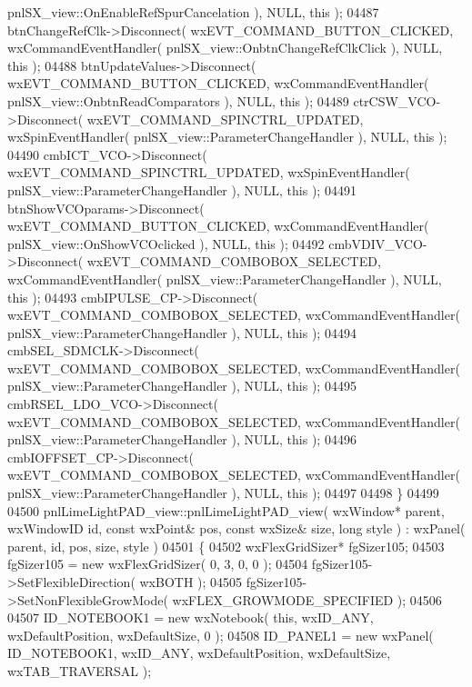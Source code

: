 \begin{DoxyCode}
      pnlSX_view::OnEnableRefSpurCancelation ), NULL, \textcolor{keyword}{this} );
04487     btnChangeRefClk->Disconnect( wxEVT\_COMMAND\_BUTTON\_CLICKED, wxCommandEventHandler( 
      pnlSX_view::OnbtnChangeRefClkClick ), NULL, \textcolor{keyword}{this} );
04488     btnUpdateValues->Disconnect( wxEVT\_COMMAND\_BUTTON\_CLICKED, wxCommandEventHandler( 
      pnlSX_view::OnbtnReadComparators ), NULL, \textcolor{keyword}{this} );
04489     ctrCSW_VCO->Disconnect( wxEVT\_COMMAND\_SPINCTRL\_UPDATED, wxSpinEventHandler( 
      pnlSX_view::ParameterChangeHandler ), NULL, \textcolor{keyword}{this} );
04490     cmbICT_VCO->Disconnect( wxEVT\_COMMAND\_SPINCTRL\_UPDATED, wxSpinEventHandler( 
      pnlSX_view::ParameterChangeHandler ), NULL, \textcolor{keyword}{this} );
04491     btnShowVCOparams->Disconnect( wxEVT\_COMMAND\_BUTTON\_CLICKED, wxCommandEventHandler( 
      pnlSX_view::OnShowVCOclicked ), NULL, \textcolor{keyword}{this} );
04492     cmbVDIV_VCO->Disconnect( wxEVT\_COMMAND\_COMBOBOX\_SELECTED, wxCommandEventHandler( 
      pnlSX_view::ParameterChangeHandler ), NULL, \textcolor{keyword}{this} );
04493     cmbIPULSE_CP->Disconnect( wxEVT\_COMMAND\_COMBOBOX\_SELECTED, wxCommandEventHandler( 
      pnlSX_view::ParameterChangeHandler ), NULL, \textcolor{keyword}{this} );
04494     cmbSEL_SDMCLK->Disconnect( wxEVT\_COMMAND\_COMBOBOX\_SELECTED, wxCommandEventHandler( 
      pnlSX_view::ParameterChangeHandler ), NULL, \textcolor{keyword}{this} );
04495     cmbRSEL_LDO_VCO->Disconnect( wxEVT\_COMMAND\_COMBOBOX\_SELECTED, wxCommandEventHandler( 
      pnlSX_view::ParameterChangeHandler ), NULL, \textcolor{keyword}{this} );
04496     cmbIOFFSET_CP->Disconnect( wxEVT\_COMMAND\_COMBOBOX\_SELECTED, wxCommandEventHandler( 
      pnlSX_view::ParameterChangeHandler ), NULL, \textcolor{keyword}{this} );
04497     
04498 \}
04499 
04500 pnlLimeLightPAD_view::pnlLimeLightPAD_view( wxWindow* parent, wxWindowID \textcolor{keywordtype}{id}, \textcolor{keyword}{const} wxPoint& pos, \textcolor{keyword}{const} 
      wxSize& size, \textcolor{keywordtype}{long} style ) : wxPanel( parent, id, pos, size, style )
04501 \{
04502     wxFlexGridSizer* fgSizer105;
04503     fgSizer105 = \textcolor{keyword}{new} wxFlexGridSizer( 0, 3, 0, 0 );
04504     fgSizer105->SetFlexibleDirection( wxBOTH );
04505     fgSizer105->SetNonFlexibleGrowMode( wxFLEX\_GROWMODE\_SPECIFIED );
04506     
04507     ID_NOTEBOOK1 = \textcolor{keyword}{new} wxNotebook( \textcolor{keyword}{this}, wxID\_ANY, wxDefaultPosition, wxDefaultSize, 0 );
04508     ID_PANEL1 = \textcolor{keyword}{new} wxPanel( ID_NOTEBOOK1, wxID\_ANY, wxDefaultPosition, wxDefaultSize, wxTAB\_TRAVERSAL );

\end{DoxyCode}
